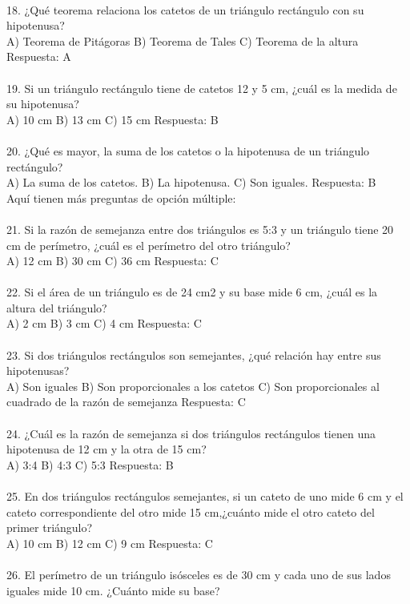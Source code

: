 \documentclass{article}
\begin{document}
\\
18. ¿Qué teorema relaciona los catetos de un triángulo rectángulo con su hipotenusa?\\
A) Teorema de Pitágoras   B) Teorema de Tales   C) Teorema de la altura   Respuesta: A\\
\\
19. Si un triángulo rectángulo tiene de catetos 12 y 5 cm, ¿cuál es la medida de su hipotenusa?\\
A) 10 cm   B) 13 cm    C) 15 cm   Respuesta: B  \\
\\
20. ¿Qué es mayor, la suma de los catetos o la hipotenusa de un triángulo rectángulo?\\
A) La suma de los catetos.   B) La hipotenusa.   C) Son iguales.   Respuesta: B\\
Aquí tienen más preguntas de opción múltiple:\\
\\
21. Si la razón de semejanza entre dos triángulos es 5:3 y un triángulo tiene 20 cm de perímetro, ¿cuál es el perímetro del otro triángulo?\\
A) 12 cm   B) 30 cm   C) 36 cm   Respuesta: C\\
\\
22. Si el área de un triángulo es de 24 cm2 y su base mide 6 cm, ¿cuál es la altura del triángulo? \\
A) 2 cm   B) 3 cm   C) 4 cm   Respuesta: C\\
\\
23. Si dos triángulos rectángulos son semejantes, ¿qué relación hay entre sus hipotenusas?\\
A) Son iguales   B) Son proporcionales a los catetos   C) Son proporcionales al cuadrado de la razón de semejanza   Respuesta: C \\
\\
24. ¿Cuál es la razón de semejanza si dos triángulos rectángulos tienen una hipotenusa de 12 cm y la otra de 15 cm? \\
A) 3:4   B) 4:3   C) 5:3   Respuesta: B\\
\\
25. En dos triángulos rectángulos semejantes, si un cateto de uno mide 6 cm y el cateto correspondiente del otro mide 15 cm,¿cuánto mide el otro cateto del primer triángulo?\\
A) 10 cm   B) 12 cm   C) 9 cm   Respuesta: C\\
\\
26. El perímetro de un triángulo isósceles es de 30 cm y cada uno de sus lados iguales mide 10 cm. ¿Cuánto mide su base?\\
\end{document}
